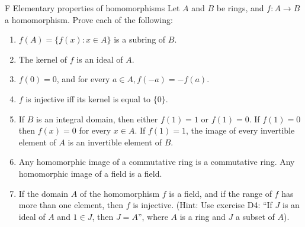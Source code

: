 \begin{exercise}{F Elementary properties of homomorphisms}
  Let $A$ and $B$ be rings, and $f:A\rightarrow B$ a homomorphism. Prove each of the following:
    \begin{enumerate}
        \item $f(A)=\{f(x): x\in A\}$ is a subring of $B$.      \item The kernel of $f$ is an ideal of $A$.
        \item $f(0)=0$, and for every $a\in A, f(-a)=-f(a)$.
        \item $f$ is injective iff its kernel is equal to $\{0\}$.
        \item If $B$ is an integral domain, then either $f(1)=1$ or $f(1)=0$. If $f(1)=0$ then $f(x)=0$ for every $x\in A$. If $f(1)=1$, the image of every invertible element of $A$ is an invertible element of $B$.
        \item Any homomorphic image of a commutative ring is a commutative ring. Any homomorphic image of a field is a field.
        \item If the domain $A$ of the homomorphism $f$ is a field, and if the range of $f$ has more than one element, then $f$ is injective. (Hint: Use exercise D4: ``If $J$ is an ideal of $A$ and $1\in J$, then $J=A$'', where $A$ is a ring and $J$ a subset of $A$).
    \end{enumerate}
\end{exercise}
